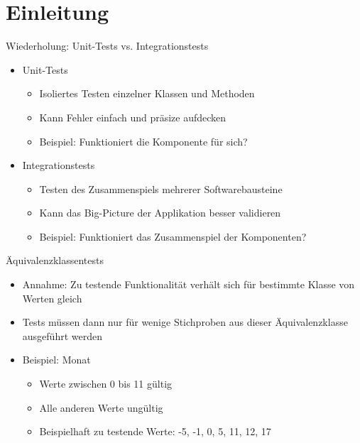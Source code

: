 \documentclass[utf8,t,aspectratio=169]{beamer}
\begin{document}
  \section{Einleitung}
    \begin{frame}[fragile]{Wiederholung: Unit-Tests vs. Integrationstests}
      \begin{itemize}
        \item Unit-Tests
          \begin{itemize}
            \item Isoliertes Testen einzelner Klassen und Methoden
            \item Kann Fehler einfach und präsize aufdecken
            \item Beispiel: \glqq{}Funktioniert die Komponente für sich?\grqq
          \end{itemize}
        \item Integrationstests
          \begin{itemize}
            \item Testen des Zusammenspiels mehrerer Softwarebausteine
            \item Kann das Big-Picture der Applikation besser validieren
            \item Beispiel: \glqq{}Funktioniert das Zusammenspiel der Komponenten?\grqq
          \end{itemize}
      \end{itemize}
    \end{frame}
    \begin{frame}[fragile]{Äquivalenzklassentests}
      \begin{itemize}
        \item Annahme: Zu testende Funktionalität verhält sich für bestimmte Klasse von Werten gleich
        \item Tests müssen dann nur für wenige Stichproben aus dieser Äquivalenzklasse ausgeführt werden
        \item Beispiel: Monat
          \begin{itemize}
            \item Werte zwischen 0 bis 11 gültig
            \item Alle anderen Werte ungültig
            \item Beispielhaft zu testende Werte: -5, -1, 0, 5, 11, 12, 17
          \end{itemize}
      \end{itemize}
    \end{frame}
\end{document}

